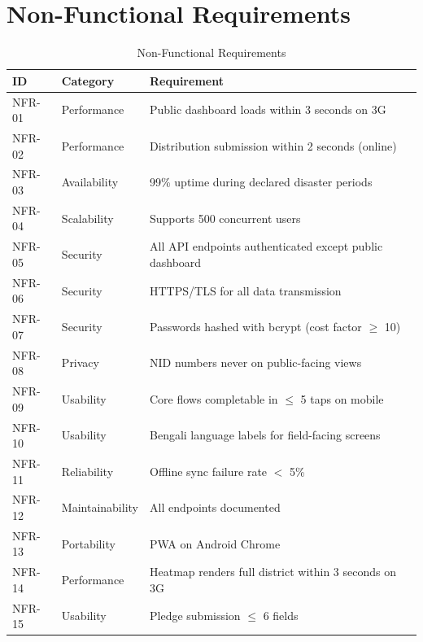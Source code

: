 \section{Non-Functional Requirements}
\begin{table}[H]
\centering
\caption{Non-Functional Requirements}
\label{tab:nfr}
\begin{tabularx}{\textwidth}{@{}llX@{}}
\toprule
ID & Category & Requirement \\
\midrule
NFR-01 & Performance & Public dashboard loads within 3 seconds on 3G \\
NFR-02 & Performance & Distribution submission within 2 seconds (online) \\
NFR-03 & Availability & 99\% uptime during declared disaster periods \\
NFR-04 & Scalability & Supports 500 concurrent users \\
NFR-05 & Security & All API endpoints authenticated except public dashboard \\
NFR-06 & Security & HTTPS/TLS for all data transmission \\
NFR-07 & Security & Passwords hashed with bcrypt (cost factor $\ge$ 10) \\
NFR-08 & Privacy & NID numbers never on public-facing views \\
NFR-09 & Usability & Core flows completable in $\le$ 5 taps on mobile \\
NFR-10 & Usability & Bengali language labels for field-facing screens \\
NFR-11 & Reliability & Offline sync failure rate $<$ 5\% \\
NFR-12 & Maintainability & All endpoints documented \\
NFR-13 & Portability & PWA on Android Chrome \\
NFR-14 & Performance & Heatmap renders full district within 3 seconds on 3G \\
NFR-15 & Usability & Pledge submission $\le$ 6 fields \\
\bottomrule
\end{tabularx}
\end{table}

